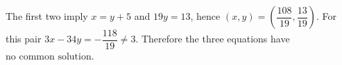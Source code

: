 The first two imply $x=y+5$ and $19y=13$, hence $(x,y)=(\dfrac{108}{19},\dfrac{13}{19})$. For this pair $3x-34y=-\dfrac{118}{19}\ne3$. Therefore the three equations have $\boxed{\text{no common solution}}$.

